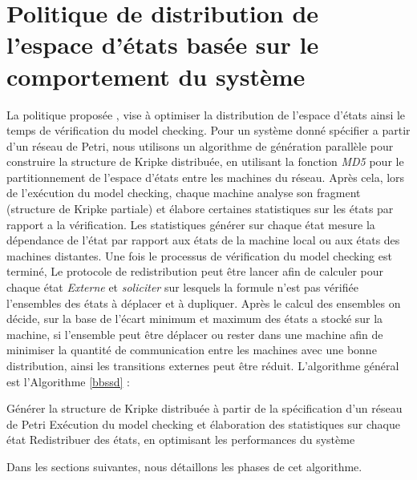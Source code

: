 
\section{Politique de distribution de l’espace d’états basée sur le	comportement du système}
 
La politique proposée \emph{\BbSSD{}}, vise à optimiser la distribution de l’espace d’états ainsi le temps de vérification du model checking. Pour un système donné spécifier a partir d'un réseau de Petri, nous utilisons un algorithme de génération parallèle pour construire la structure de Kripke distribuée, en utilisant la fonction \emph{MD5} pour le partitionnement de l’espace d’états entre les machines du réseau. Après cela, lors de l'exécution du model checking, chaque machine analyse son fragment (structure de Kripke partiale) et élabore certaines statistiques sur les états par rapport a la vérification. Les statistiques  générer sur chaque état mesure la dépendance de l'état par rapport aux états de la machine local ou aux états des machines distantes. Une fois le processus de vérification du model checking est terminé, Le protocole de redistribution peut être lancer afin de calculer pour chaque état \emph{Externe} et \emph{soliciter} sur lesquels la formule n'est pas vérifiée l'ensembles des états à déplacer et à dupliquer. Après le calcul des ensembles on décide, sur la base de l'écart minimum et maximum des états a stocké sur la machine, si l'ensemble peut être déplacer ou rester dans une machine afin de minimiser la quantité de communication entre les machines avec une bonne distribution, ainsi les transitions externes peut être réduit.
L’algorithme général est l'Algorithme \ref{bbssd} :\\
\begin{algorithm}[H]\label{bbssd}
	\SetAlgoLined
	 Générer la structure de Kripke distribuée à partir de la spécification d'un réseau de Petri\;
	 Exécution du model checking et élaboration des statistiques sur chaque état\;
	 Redistribuer des états, en optimisant les performances du système\;	  
	\caption{\BbSSD{}}
\end{algorithm}

Dans les sections suivantes, nous détaillons les phases de cet algorithme.

